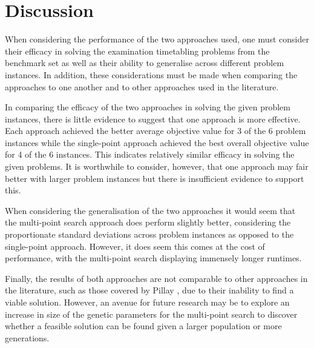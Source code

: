 \section{Discussion}
When considering the performance of the two approaches used, one must consider their efficacy in solving the examination timetabling problems from the benchmark set as well as their ability to generalise across different problem instances. In addition, these considerations must be made when comparing the approaches to one another and to other approaches used in the literature.

In comparing the efficacy of the two approaches in solving the given problem instances, there is little evidence to suggest that one approach is more effective. Each approach achieved the better average objective value for 3 of the 6 problem instances while the single-point approach achieved the best overall objective value for 4 of the 6 instances. This indicates relatively similar efficacy in solving the given problems. It is worthwhile to consider, however, that one approach may fair better with larger problem instances but there is insufficient evidence to support this.

When considering the generalisation of the two approaches it would seem that the multi-point search approach does perform slightly better, considering the proportionate standard deviations across problem instances as opposed to the single-point approach. However, it does seem this comes at the cost of performance, with the multi-point search displaying immensely longer runtimes.

Finally, the results of both approaches are not comparable to other approaches in the literature, such as those covered by Pillay \cite{pillay2016review}, due to their inability to find a viable solution. However, an avenue for future research may be to explore an increase in size of the genetic parameters for the multi-point search to discover whether a feasible solution can be found given a larger population or more generations.